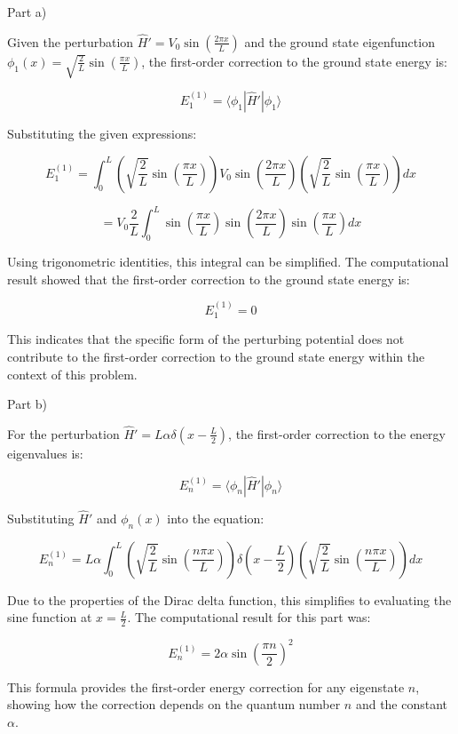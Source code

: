 \documentclass[a4paper,11pt]{article}
\begin{document}
Part a)

Given the perturbation \(\hat{H}' = V_0 \sin\left(\frac{2 \pi x}{L} \right)\) and the ground state eigenfunction \(\phi_1(x) = \sqrt{\frac{2}{L}} \sin\left(\frac{\pi x}{L} \right)\), the first-order correction to the ground state energy is:

\[ E_1^{(1)} = \langle \phi_1 | \hat{H}' | \phi_1 \rangle \]

Substituting the given expressions:

\[ E_1^{(1)} = \int_{0}^{L} \left( \sqrt{\frac{2}{L}} \sin\left(\frac{\pi x}{L} \right) \right) V_0 \sin\left(\frac{2 \pi x}{L} \right) \left( \sqrt{\frac{2}{L}} \sin\left(\frac{\pi x}{L} \right) \right) dx \]

\[ = V_0 \frac{2}{L} \int_{0}^{L} \sin\left(\frac{\pi x}{L} \right) \sin\left(\frac{2 \pi x}{L} \right) \sin\left(\frac{\pi x}{L} \right) dx \]

Using trigonometric identities, this integral can be simplified. The computational result showed that the first-order correction to the ground state energy is:

\[ E_1^{(1)} = 0 \]

This indicates that the specific form of the perturbing potential does not contribute to the first-order correction to the ground state energy within the context of this problem.

Part b)

For the perturbation \(\hat{H}' = L\alpha \delta\left(x - \frac{L}{2} \right)\), the first-order correction to the energy eigenvalues is:

\[ E_n^{(1)} = \langle \phi_n | \hat{H}' | \phi_n \rangle \]

Substituting \(\hat{H}'\) and \(\phi_n(x)\) into the equation:

\[ E_n^{(1)} = L\alpha \int_{0}^{L} \left( \sqrt{\frac{2}{L}} \sin\left(\frac{n \pi x}{L} \right) \right) \delta\left(x - \frac{L}{2} \right) \left( \sqrt{\frac{2}{L}} \sin\left(\frac{n \pi x}{L} \right) \right) dx \]

Due to the properties of the Dirac delta function, this simplifies to evaluating the sine function at \(x = \frac{L}{2}\). The computational result for this part was:

\[ E_n^{(1)} = 2\alpha\sin\left(\frac{\pi n}{2}\right)^2 \]

This formula provides the first-order energy correction for any eigenstate \(n\), showing how the correction depends on the quantum number \(n\) and the constant \(\alpha\). \\
\end{document}
